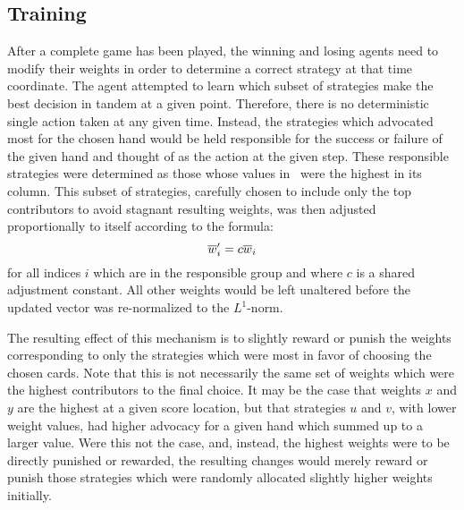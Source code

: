 
\subsection{Training}
\label{sec:dm-methods-training}



After a complete game has been played, the winning and losing agents need to
modify their weights in order to determine a correct strategy at that time
coordinate.
%
The agent attempted to learn which subset of strategies make the best
decision in tandem at a given point.
%
Therefore, there is no deterministic single action taken at any given
time.
%
Instead, the strategies which advocated most for the chosen hand would be held
responsible for the success or failure of the given hand and thought of as
the action at the given step.
%
These responsible strategies were determined as those whose
values in \Smat\ were the highest in its column.
%
This subset of strategies,
carefully chosen to include only the top contributors
to avoid stagnant resulting weights,
was then adjusted proportionally to itself according to the formula:
\[
	\overline{w}'_{i} = c \overline{w}_{i}
\]
for all indices $i$ which are in the responsible group and
where $c$ is a shared adjustment constant.
%
All other weights would be left unaltered
before the updated vector was re-normalized to the $L^1$-norm.

The resulting effect of this mechanism is to slightly reward or punish the weights
corresponding to only the strategies which were most in favor of choosing
the chosen cards.
%
Note that this is not necessarily the same set of weights which were the highest
contributors to the final choice.
%
It may be the case that weights $x$ and $y$ are the highest
at a given score location,
but that strategies $u$ and $v$,
with lower weight values,
had higher advocacy for a given hand which summed up to a larger value.
%
Were this not the case,
and, instead,
the highest weights were to be directly punished or rewarded,
the resulting changes would merely reward or punish those strategies which
were randomly allocated slightly higher weights initially.

